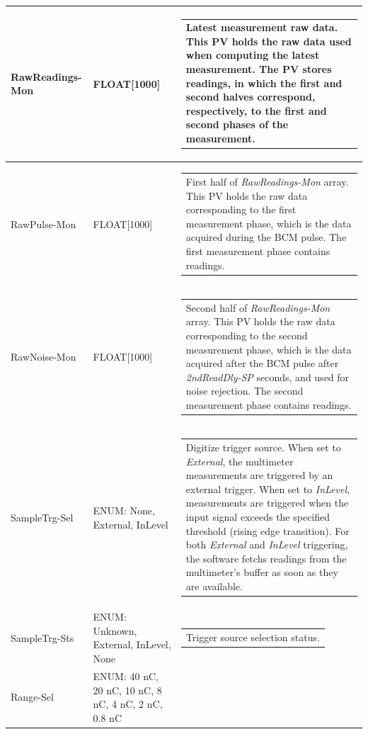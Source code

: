 \documentclass[openany]{article}
\begin{document}
\begin{longtable}{| m{3.0cm} m{4.5cm} m{7.0cm} |}
		RawReadings-Mon & FLOAT[1000] & \begin{tabular}{@{}m{6cm}@{}}
	    					Latest measurement raw data. This PV holds the raw data used when computing the latest measurement. The PV stores $ 2 \times count $ readings, in which the first and second halves correspond, respectively, to the first and second phases of the measurement.
						\end{tabular} \\ \hline
		RawPulse-Mon & FLOAT[1000] & \begin{tabular}{@{}m{6cm}@{}}
	    					First half of \emph{RawReadings-Mon} array. This PV holds the raw data corresponding to the first measurement phase, which is the data acquired during the BCM pulse. The first measurement phase contains $count$ readings.
						\end{tabular} \\ \hline
		RawNoise-Mon & FLOAT[1000] & \begin{tabular}{@{}m{6cm}@{}}
	    					Second half of \emph{RawReadings-Mon} array. This PV holds the raw data corresponding to the second measurement phase, which is the data acquired after the BCM pulse after \emph{2ndReadDly-SP} seconds, and used for noise rejection. The second measurement phase contains $count$ readings.
						\end{tabular} \\ \hline
		SampleTrg-Sel & ENUM: None, External, InLevel & \begin{tabular}{@{}m{6cm}@{}}
				      	  Digitize trigger source. When set to \emph{External}, the multimeter measurements are triggered by an external trigger. When set to \emph{InLevel}, measurements are triggered when the input signal exceeds the specified threshold (rising edge transition). For both \emph{External} and \emph{InLevel} triggering, the software fetchs $ 2 \times count $ readings from the multimeter's buffer as soon as they are available.
					  \end{tabular} \\ \hline
		SampleTrg-Sts & ENUM: Unknown, External, InLevel, None & \begin{tabular}{@{}m{6cm}@{}}
	    					Trigger source selection status.
						\end{tabular} \\ \hline
		Range-Sel & ENUM: 40 nC, 20 nC, 10 nC, 8 nC, 4 nC, 2 nC, 0.8 nC & \begin{tabular}{@{}m{6cm}@{}}

\end{tabular}
\end{longtable}
\end{document}
